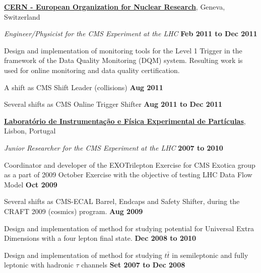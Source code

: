 \documentclass[10pt]{article}
\newenvironment{outerlist}[1][\enskip\textbullet]%
        {\begin{itemize}[#1]}{\end{itemize}%
         \vspace{-.6\baselineskip}}
\newenvironment{innerlist}[1][\enskip\textbullet]%
        {\begin{compactitem}[#1]}{\end{compactitem}}
\newcommand{\blankline}{\quad\pagebreak[2]}
\begin{document}
\href{http://www.cern.ch/}{\textbf{CERN - European Organization for Nuclear Research}},
Geneva, Switzerland
\begin{outerlist}

\item[] \textit{Engineer/Physicist for the CMS Experiment at the LHC}%
        \hfill \textbf{Feb 2011 to Dec 2011}
\begin{innerlist}
\item Design and implementation of monitoring tools for the Level 1 Trigger in the framework of
      the Data Quality Monitoring (DQM) system. Resulting work is used for online monitoring and
      data quality certification. 
\item A shift as CMS Shift Leader (collisions) \hfill \textbf{Aug 2011}
\item Several shifts as CMS Online Trigger Shifter \hfill \textbf{Aug 2011 to Dec 2011}
\end{innerlist}

\end{outerlist}
\blankline

%
\href{http://www.lip.pt/}{\textbf{Laboratório de Instrumentação e Física Experimental de Partículas}},
Lisbon, Portugal
\begin{outerlist}

\item[] \textit{Junior Researcher for the CMS Experiment at the LHC}%
        \hfill \textbf{2007 to 2010}
\begin{innerlist}
\item Coordinator and developer of the EXOTrilepton Exercise for CMS Exotica group as a part of 2009 October Exercise with the objective of testing LHC Data Flow Model
\hfill \textbf{Oct 2009}
\item Several shifts as CMS-ECAL Barrel, Endcaps and Safety Shifter, during the CRAFT 2009 (cosmics) program. 
\hfill \textbf{Aug 2009}
\item Design and implementation of method for studying potential for Universal Extra Dimensions with a four lepton final state.
\hfill \textbf{Dec 2008 to 2010}
\item Design and implementation of method for studying $t\bar{t}$ in semileptonic and fully leptonic with hadronic $\tau$ channels
\hfill \textbf{Set 2007 to Dec 2008}
\end{innerlist}

\end{outerlist}

\blankline
\end{document}
